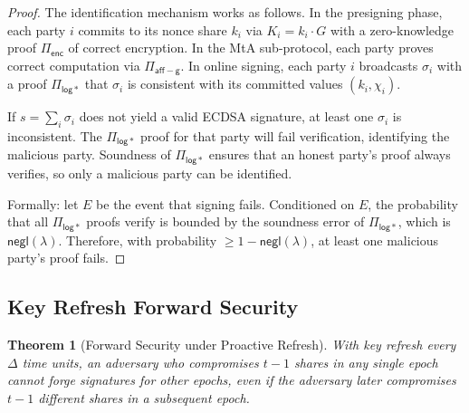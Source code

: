 \documentclass[11pt,twocolumn]{article}
\newtheorem{theorem}{Theorem}[section]
\begin{document}
\begin{proof}
The identification mechanism works as follows. In the presigning phase, each party $i$
commits to its nonce share $k_i$ via $K_i = k_i \cdot G$ with a zero-knowledge proof
$\Pi_{\mathsf{enc}}$ of correct encryption. In the MtA sub-protocol, each party proves
correct computation via $\Pi_{\mathsf{aff-g}}$. In online signing, each party $i$
broadcasts $\sigma_i$ with a proof $\Pi_{\mathsf{log*}}$ that $\sigma_i$ is consistent
with its committed values $(k_i, \chi_i)$.

If $s = \sum_i \sigma_i$ does not yield a valid ECDSA signature, at least one $\sigma_i$
is inconsistent. The $\Pi_{\mathsf{log*}}$ proof for that party will fail verification,
identifying the malicious party. Soundness of $\Pi_{\mathsf{log*}}$ ensures that an
honest party's proof always verifies, so only a malicious party can be identified.

Formally: let $E$ be the event that signing fails. Conditioned on $E$, the probability
that all $\Pi_{\mathsf{log*}}$ proofs verify is bounded by the soundness error of
$\Pi_{\mathsf{log*}}$, which is $\mathsf{negl}(\lambda)$. Therefore, with probability
$\geq 1 - \mathsf{negl}(\lambda)$, at least one malicious party's proof fails.
\end{proof}

\subsection{Key Refresh Forward Security}

\begin{theorem}[Forward Security under Proactive Refresh]
\label{thm:forward}
With key refresh every $\Delta$ time units, an adversary who compromises $t-1$ shares
in any single epoch cannot forge signatures for other epochs, even if the adversary
later compromises $t-1$ different shares in a subsequent epoch.
\end{theorem}
\end{document}
